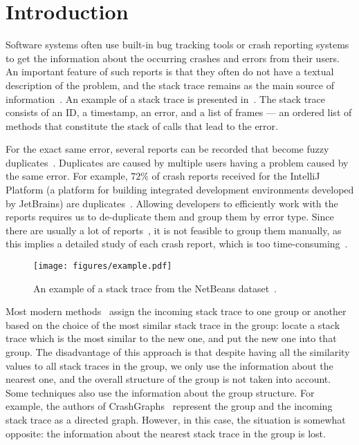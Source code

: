 \section{Introduction}\label{sec:introduction}

Software systems often use built-in bug tracking tools or crash reporting systems~\cite{crs_1,crs_2,crs_3} to get the information about the occurring crashes and errors from their users.
An important feature of such reports is that they often do not have a textual description of the problem, and the stack trace remains as the main source of information~\cite{s3m}.
An example of a stack trace is presented in~.
The stack trace consists of an ID, a timestamp, an error, and a list of frames --- an ordered list of methods that constitute the stack of calls that lead to the error.

For the exact same error, several reports can be recorded that become fuzzy duplicates~\cite{lerch,tracesim,s3m}.
Duplicates are caused by multiple users having a problem caused by the same error.
For example, $72\%$ of crash reports received for the IntelliJ Platform (a platform for building integrated development environments developed by JetBrains) are duplicates~\cite{tracesim}. 
Allowing developers to efficiently work with the reports requires us to de-duplicate them and group them by error type.
Since there are usually a lot of reports~\cite{durfex,many_reports_1}, it is not feasible to group them manually, as this implies a detailed study of each crash report, which is too time-consuming~\cite{researh_about_capacity}. 

\begin{figure}[t]
\centering
    \texttt{[image: figures/example.pdf]}
    \centering
    \vspace{-0.4cm}
    \caption{An example of a stack trace from the NetBeans dataset~\cite{s3m}.}
    \vspace{-0.4cm}
    \label{fig:stacktrace}
\end{figure}

Most modern methods~\cite{modani,lerch,durfex,tracesim,s3m} assign the incoming stack trace to one group or another based on the choice of the most similar stack trace in the group: locate a stack trace which is the most similar to the new one, and put the new one into that group. 
The disadvantage of this approach is that despite having all the similarity values to all stack traces in the group, we only use the information about the nearest one, and the overall structure of the group is not taken into account.
Some techniques also use the information about the group structure.
For example, the authors of CrashGraphs~\cite{crash_graphs} represent the group and the incoming stack trace as a directed graph. 
However, in this case, the situation is somewhat opposite: the information about the nearest stack trace in the group is lost. 

